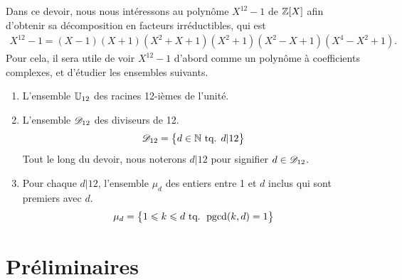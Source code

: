 Dans ce devoir, nous nous intéressons au polynôme $X^{12} - 1$ de $\mathbb{Z}[X]$ afin d'obtenir sa décomposition en facteurs irréductibles, qui est
	\begin{align}
	X^{12} - 1 = \left(X-1\right)\left(X+1\right)\left(X^2 + X + 1\right)\left(X^2 + 1\right)\left(X^2 - X + 1\right)\left(X^4 - X^2 +1\right). \tag{équation 1} \label{eq:1}
	\end{align}
Pour cela, il sera utile de voir $X^{12}-1$ d'abord comme un polynôme à coefficients complexes, et d'étudier les ensembles suivants.
\begin{enumerate}
	\item
	L'ensemble $\mathbb{U}_{12}$ des racines 12-ièmes de l'unité.
	\item
	L'ensemble $\mathcal{D}_{12}$ des diviseurs de 12.
		\[ \mathcal{D}_{12} = \bigl\{  d \in \mathbb{N} \text{ tq. } d | 12  \bigr\} \]
	Tout le long du devoir, nous noterons $d|12$ pour signifier $d\in\mathcal{D}_{12}$.
	\item
	Pour chaque $d|12$, l'ensemble $\mu_d$ des entiers entre 1 et $d$ inclus qui sont premiers avec $d$.
		\[ \mu_d = \bigl\{  1 \leqslant k \leqslant d \text{ tq. } \operatorname{pgcd}(k, d) = 1  \bigr\} \]
\end{enumerate}

\section{Préliminaires}


